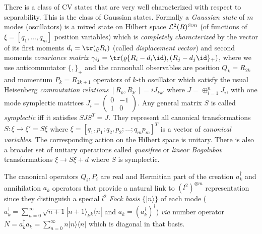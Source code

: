 \documentclass[twocolumn,aps,rmp]{revtex4}
\begin{document}
There is a class of CV states that are very well characterized with
respect to separability. This is the class of Gaussian states.
Formally a {\it Gaussian state} of $m$ modes (oscillators) is a
mixed state on Hilbert space ${\cal L}^{2}(R)^{\otimes m}$ (of
functions of $\xi=[q_{1},\ldots,q_{m}]$ position variables) which is
{\it completely characterized} by the vector of its first moments
$d_{i}={\tr}(\varrho R_{i})$ (called {\it displacement vector}) and
second moments {\it covariance matrix}
$\gamma_{ij}={\tr}(\varrho\{R_{i}-d_{i}\id),(R_{j}-d_{j}\id\}_{+})$, where
we use anticommutator $\{ , \}_{+}$ and the cannonball observables
are position $Q_{k}=R_{2k}$ and momentum $P_{k}=R_{2k+1}$ operators
of $k$-th oscillator which satisfy the usual Heisenberg {\it
commutation relations} $[R_{k},R_{k'}]=iJ_{kk'}$ where
$J=\oplus_{i=1}^{n} J_{i}$, with one mode symplectic matrices
$J_{i}=\left(
\begin{array}{cc}
0 &-1\\
1 &0
\end{array} \right)$.
Any general matrix $S$ is called {\it symplectic} iff it satisfies
$SJS^{T}=J$. They represent all canonical transformations
$S:\xi\rightarrow \xi'=S\xi$ where
$\xi=[q_{1},p_{1};q_{2},p_{2};\ldots;q_{m}p_{m}]^{T}$ is a vector of
{\it canonical variables}. The corresponding action on the Hilbert
space is unitary. There is also a broader set of unitary operations
called {\it quasifree} or {\it linear Bogolubov} transformations
$\xi \rightarrow S \xi + d$ where $S$ is symplectic.

The canonical operators $Q_{i},P_{i}$ are real and Hermitian part of
the creation $a_{k}^{\dagger}$ and annihilation $a_{k}$ operators
that provide a natural link to $(l^{2})^{\otimes m}$ representation
since they distinguish a special $l^{2}$ {\it Fock basis} $\{
|n\rangle \}$ of each mode ($a_{k}^{\dagger}=\sum_{n=0}^{\infty}
\sqrt{n+1}|n+1 \rangle_{k} {}_{k}\langle n|$ and
$a_{k}=(a_{k}^\dagger)^\dagger $) {\it via} number operator
$N=a_{k}^{\dagger}a_{k}=\sum_{n=0}^{\infty}n|n\rangle\langle n|$
which is diagonal in that basis.
\end{document}
